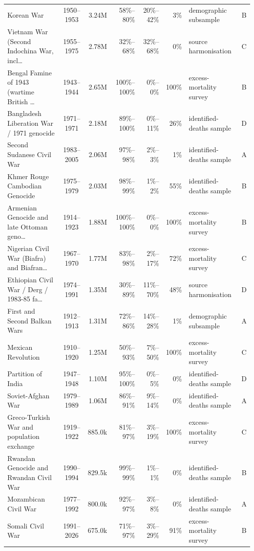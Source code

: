 \documentclass[11pt]{article}
\begin{document}
\begin{scriptsize}
\begin{longtable}{p{4.7cm} c r r r r p{2.8cm} c}
Korean War & 1950--1953 & 3.24M & 58\%--80\% & 20\%--42\% & 3\% & demographic subsample & B \\
Vietnam War (Second Indochina War, incl\ldots{} & 1955--1975 & 2.78M & 32\%--68\% & 32\%--68\% & 0\% & source harmonisation & C \\
Bengal Famine of 1943 (wartime British \ldots{} & 1943--1944 & 2.65M & 100\%--100\% & 0\%--0\% & 100\% & excess-mortality survey & B \\
Bangladesh Liberation War / 1971 genocide & 1971--1971 & 2.18M & 89\%--100\% & 0\%--11\% & 26\% & identified-deaths sample & D \\
Second Sudanese Civil War & 1983--2005 & 2.06M & 97\%--98\% & 2\%--3\% & 1\% & identified-deaths sample & A \\
Khmer Rouge Cambodian Genocide & 1975--1979 & 2.03M & 98\%--99\% & 1\%--2\% & 55\% & identified-deaths sample & B \\
Armenian Genocide and late Ottoman geno\ldots{} & 1914--1923 & 1.88M & 100\%--100\% & 0\%--0\% & 100\% & excess-mortality survey & B \\
Nigerian Civil War (Biafra) and Biafran\ldots{} & 1967--1970 & 1.77M & 83\%--98\% & 2\%--17\% & 72\% & excess-mortality survey & C \\
Ethiopian Civil War / Derg / 1983-85 fa\ldots{} & 1974--1991 & 1.35M & 30\%--89\% & 11\%--70\% & 48\% & source harmonisation & D \\
First and Second Balkan Wars & 1912--1913 & 1.31M & 72\%--86\% & 14\%--28\% & 1\% & demographic subsample & A \\
Mexican Revolution & 1910--1920 & 1.25M & 50\%--93\% & 7\%--50\% & 100\% & excess-mortality survey & C \\
Partition of India & 1947--1948 & 1.10M & 95\%--100\% & 0\%--5\% & 0\% & identified-deaths sample & D \\
Soviet-Afghan War & 1979--1989 & 1.06M & 86\%--91\% & 9\%--14\% & 0\% & identified-deaths sample & A \\
Greco-Turkish War and population exchange & 1919--1922 & 885.0k & 81\%--97\% & 3\%--19\% & 100\% & excess-mortality survey & C \\
Rwandan Genocide and Rwandan Civil War & 1990--1994 & 829.5k & 99\%--99\% & 1\%--1\% & 0\% & identified-deaths sample & B \\
Mozambican Civil War & 1977--1992 & 800.0k & 92\%--97\% & 3\%--8\% & 0\% & identified-deaths sample & A \\
Somali Civil War & 1991--2026 & 675.0k & 71\%--97\% & 3\%--29\% & 91\% & excess-mortality survey & B \\

\end{longtable}
\end{scriptsize}
\end{document}
